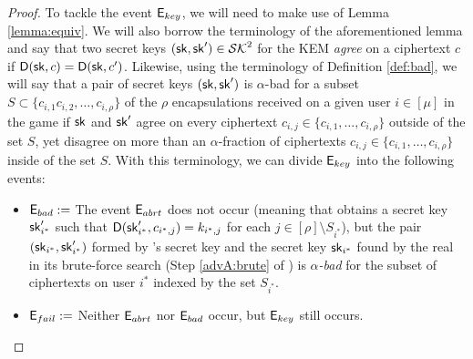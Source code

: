 \begin{proof}
  To tackle the event \(\mathsf{E}_{key}\),
  we will need to make use of Lemma \ref{lemma:equiv}.
  We will also borrow the terminology of the aforementioned lemma
  and say that two secret keys \((\mathsf{sk},\mathsf{sk}') \in \mathcal{SK}^{2}\) for the KEM \KEM
  \emph{agree} on a ciphertext \(c\) if \(\mathsf{D}(\mathsf{sk},c) = \mathsf{D}(\mathsf{sk},c')\).
  Likewise, using the terminology of Definition \ref{def:bad},
  we will say that a pair of secret keys \((\mathsf{sk},\mathsf{sk}')\) is \(\alpha\)-bad
  for a subset \(S \subset \{c_{i,1}c_{i,2},\ldots,c_{i,\rho}\}\)
  of the \(\rho\) encapsulations received on a given user \(i \in [\mu]\)
  in the \OWECPA game if \(\mathsf{sk}\) and \(\mathsf{sk}'\) agree
  on every ciphertext \(c_{i,j} \in \{c_{i,1},\ldots,c_{i,\rho}\}\)
  outside of the set \(S\),
  yet disagree on more than an \(\alpha\)-fraction of ciphertexts
  \(c_{i,j} \in \{c_{i,1},\ldots,c_{i,\rho}\}\)
  inside of the set \(S\).
  With this terminology, we can divide \(\mathsf{E}_{key}\) into the following events:
  \begin{itemize}[label={\textbullet},itemsep=0.1cm]
    \item \(\mathsf{E}_{bad} := \) The event \(\mathsf{E}_{abrt}\) does not occur
          (meaning that \redM obtains a secret key \(\mathsf{sk}_{i^{*}}'\) such that
          \(\mathsf{D}(\mathsf{sk}_{i^{*}}',c_{i^{*},j}) = k_{i^{*},j}\) for each \(j \in [\rho] \setminus S_{i^{*}}\)),
          but the pair \((\mathsf{sk}_{i^{*}}, \mathsf{sk}_{i^{*}}')\) formed by \redM's secret key
          and the secret key \(\mathsf{sk}_{i^{*}}\) found by the real \advA in
          its brute-force search (Step \ref{advA:brute} of \advA)
          is \emph{\(\alpha\)-bad} for the subset of ciphertexts on user \(i^{*}\)
          indexed by the set \(S_{i^{*}}\).
    \item \(\mathsf{E}_{fail} := \) Neither \(\mathsf{E}_{abrt}\) nor \(\mathsf{E}_{bad}\) occur,
          but \(\mathsf{E}_{key}\) still occurs.
  \end{itemize}


\end{proof}
